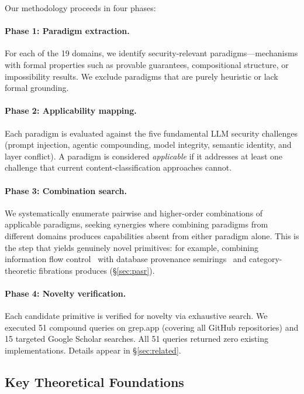 Our methodology proceeds in four phases:

\paragraph{Phase 1: Paradigm extraction.} For each of the 19 domains, we identify security-relevant paradigms---mechanisms with formal properties such as provable guarantees, compositional structure, or impossibility results. We exclude paradigms that are purely heuristic or lack formal grounding.

\paragraph{Phase 2: Applicability mapping.} Each paradigm is evaluated against the five fundamental LLM security challenges (prompt injection, agentic compounding, model integrity, semantic identity, and layer conflict). A paradigm is considered \emph{applicable} if it addresses at least one challenge that current content-classification approaches cannot.

\paragraph{Phase 3: Combination search.} We systematically enumerate pairwise and higher-order combinations of applicable paradigms, seeking synergies where combining paradigms from different domains produces capabilities absent from either paradigm alone. This is the step that yields genuinely novel primitives: for example, combining information flow control~\cite{denning1976} with database provenance semirings~\cite{green2007} and category-theoretic fibrations produces \pasr (\S\ref{sec:pasr}).

\paragraph{Phase 4: Novelty verification.} Each candidate primitive is verified for novelty via exhaustive search. We executed 51 compound queries on grep.app (covering all GitHub repositories) and 15 targeted Google Scholar searches. All 51 queries returned zero existing implementations. Details appear in \S\ref{sec:related}.

\subsection{Key Theoretical Foundations}

